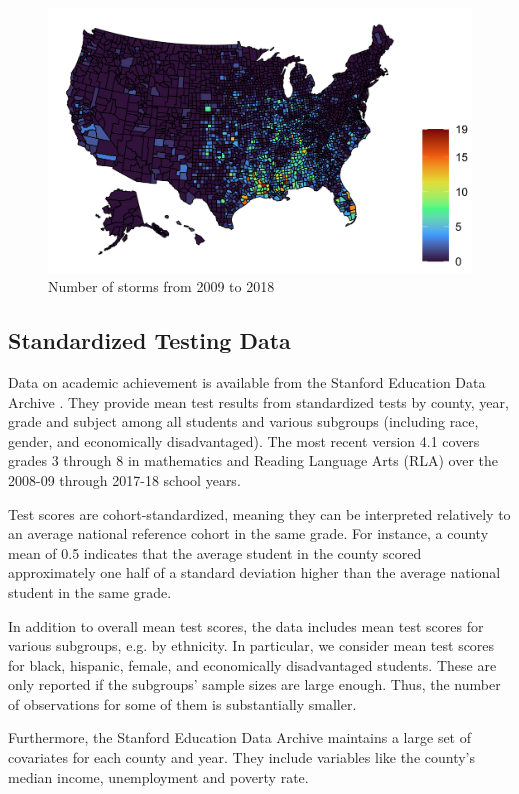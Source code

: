 \begin{figure}[!h]
	\centering
	\includegraphics[scale=1]{"../Code & Data/StormMap.png"}
	\caption{Number of storms from 2009 to 2018}
	\label{StormMap}
\end{figure}


\subsection{Standardized Testing Data}

Data on academic achievement is available from the Stanford Education Data Archive \citep{SEDA}. They provide mean test results from standardized tests by county, year, grade and subject among all students and various subgroups (including race, gender, and economically disadvantaged). The most recent version 4.1 covers grades 3 through 8 in mathematics and Reading Language Arts (RLA) over the 2008-09 through 2017-18 school years.

Test scores are cohort-standardized, meaning they can be interpreted relatively to an average national reference cohort in the same grade. For instance, a county mean of 0.5 indicates that the average student in the county scored approximately one half of a standard deviation higher than the average national student in the same grade.

In addition to overall mean test scores, the data includes mean test scores for various subgroups, e.g. by ethnicity. In particular, we consider mean test scores for black, hispanic, female, and economically disadvantaged students. These are only reported if the subgroups' sample sizes are large enough. Thus, the number of observations for some of them is substantially smaller.

Furthermore, the Stanford Education Data Archive maintains a large set of covariates for each county and year. They include variables like the county's median income, unemployment and poverty rate.


